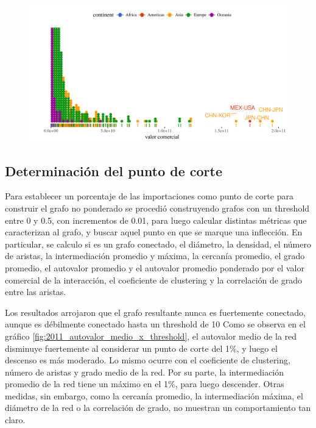 \documentclass[runningheads,a4paper]{llncs}
\begin{document}
\begin{figure}[h]
    \centering
    \includegraphics[scale=.5]{2011_freq_interacciones_0}
    \caption{}
    \label{fig:2011_freq_interacciones_0}
\end{figure}


\subsection{Determinación del punto de corte}

Para establecer un porcentaje de las importaciones como punto de corte para construir el grafo no ponderado se procedió construyendo grafos con un threshold entre 0 y 0.5, con incrementos de 0.01, para luego calcular distintas métricas que caracterizan al grafo, y buscar aquel punto en que se marque una inflección. En particular, se calculo si es un grafo conectado, el diámetro, la densidad, el número de aristas, la intermediación promedio y máxima, la cercanía promedio, el grado promedio, el autovalor promedio y el autovalor promedio ponderado por el valor comercial de la interacción, el coeficiente de clustering y la correlación de grado entre las aristas.

Los resultados arrojaron que el grafo resultante nunca es fuertemente conectado, aunque es débilmente conectado hasta un threshold de 10%
Como se observa en el gráfico \ref{fig:2011_autovalor_medio_x_threshold}, el autovalor medio de la red disminuye fuertemente al considerar un punto de corte del 1\%, y luego el descenso es más moderado. Lo mismo ocurre con el coeficiente de clustering, número de aristas y grado medio de la red. Por su parte, la intermediación promedio de la red tiene un máximo en el 1\%, para luego descender. Otras medidas, sin embargo, como la cercanía promedio, la intermediación máxima, el diámetro de la red o la correlación de grado, no muestran un comportamiento tan claro.
\end{document}

